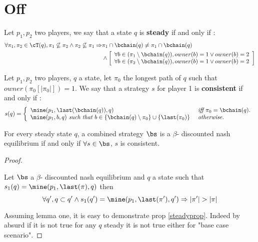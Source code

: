 

\section{Off}

\begin{mydef}
	Let $p_1,p_2$ two players, we say that a state $q$ is \textbf{steady} if and only if : 
	\begin{align*}
		\forall \pi_1,\pi_2 \in \cT(q), \pi_1 \not \subseteq \pi_2 \land \pi_2 \not \subseteq \pi_1 \Rightarrow & \pi_1 \cap \bchain(q) \neq \pi_1 \cap \bchain(q) \\
		& \land \left[
		\begin{array}{ll}
		\forall b \in (\pi_1 \setminus \bchain(q)), owner(b) = 1 \lor owner(b) = 2 \\
		\forall b \in (\pi_2 \setminus \bchain(q)), owner(b) = 1 \lor owner(b) = 2 \\
		\end{array}\right] \\ 
	\end{align*}
\end{mydef}

\begin{mydef}
	Let $p_1,p_2$ two players, $q$ a state, let $\pi_0$ the longest path of $q$ such that $owner(\pi_0[|\pi_0|]) = 1$.
	We say that a strategy $s$ for player 1 is \textbf{consistent} if and only if : 
	$$
	 s(q) = \left\{
	 \begin{array}{ll}
	 \mine(p_1,\last(\bchain(q)),q) & \textit{ iff } \pi_0 = \bchain(q). \\
	 \mine(p_1,b,q) \textit{ such that } b\in \{\bchain(q)\setminus \pi_0\} \cup \{\last(\pi_0)\} & \textit{ otherwise.} \\
	 \end{array}\right. \\ 
	$$
\end{mydef}

\begin{myprop}
	\label{steadyprop}
	For every steady state $q$, a combined strategy $\bs$ is a $\beta$- discounted nash equilibrium if and only if $\forall s \in \bs$, $s$ is consistent.
\end{myprop}

\begin{proof}
	\begin{mylem}
		Let $\bs$ a $\beta$- discounted nash equilibrium and $q$ a state such that $s_1(q) = \mine(p_1,\last(\pi),q)$ then $$\forall q', q \subset q' \land s_1(q') =  \mine(p_1,\last(\pi'),q') \Rightarrow |\pi'| > |\pi|$$
	\end{mylem}
	Assuming lemma one, it is easy to demonstrate prop \ref{steadyprop}. Indeed by absurd if it is not true for any $q$ steady it is not true either for "base case scenario".
\end{proof}

